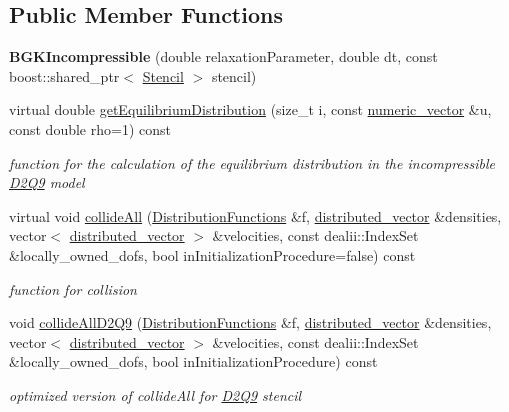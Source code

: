 \subsection*{Public Member Functions}
\begin{DoxyCompactItemize}
\item 
\hypertarget{classnatrium_1_1BGKIncompressible_a356e597953a0a7f69ca797a4c15f4039}{
{\bfseries BGKIncompressible} (double relaxationParameter, double dt, const boost::shared\_\-ptr$<$ \hyperlink{classnatrium_1_1Stencil}{Stencil} $>$ stencil)}
\label{classnatrium_1_1BGKIncompressible_a356e597953a0a7f69ca797a4c15f4039}

\item 
virtual double \hyperlink{classnatrium_1_1BGKIncompressible_a26dd8954261b04f8383ca9d37f5ac8c0}{getEquilibriumDistribution} (size\_\-t i, const \hyperlink{namespacenatrium_a67c39077adc6634f8fa3762b8eef24c4}{numeric\_\-vector} \&u, const double rho=1) const 
\begin{DoxyCompactList}\small\item\em function for the calculation of the equilibrium distribution in the incompressible \hyperlink{classnatrium_1_1D2Q9}{D2Q9} model \item\end{DoxyCompactList}\item 
virtual void \hyperlink{classnatrium_1_1BGKIncompressible_a53dc53b5ddb31a6ef67acd25abb405f1}{collideAll} (\hyperlink{classnatrium_1_1DistributionFunctions}{DistributionFunctions} \&f, \hyperlink{namespacenatrium_a903d2b92917f582f2ff05f52160ab811}{distributed\_\-vector} \&densities, vector$<$ \hyperlink{namespacenatrium_a903d2b92917f582f2ff05f52160ab811}{distributed\_\-vector} $>$ \&velocities, const dealii::IndexSet \&locally\_\-owned\_\-dofs, bool inInitializationProcedure=false) const 
\begin{DoxyCompactList}\small\item\em function for collision \item\end{DoxyCompactList}\item 
\hypertarget{classnatrium_1_1BGKIncompressible_aa7f79409678bd0992ca7da81c4632707}{
void \hyperlink{classnatrium_1_1BGKIncompressible_aa7f79409678bd0992ca7da81c4632707}{collideAllD2Q9} (\hyperlink{classnatrium_1_1DistributionFunctions}{DistributionFunctions} \&f, \hyperlink{namespacenatrium_a903d2b92917f582f2ff05f52160ab811}{distributed\_\-vector} \&densities, vector$<$ \hyperlink{namespacenatrium_a903d2b92917f582f2ff05f52160ab811}{distributed\_\-vector} $>$ \&velocities, const dealii::IndexSet \&locally\_\-owned\_\-dofs, bool inInitializationProcedure) const }
\label{classnatrium_1_1BGKIncompressible_aa7f79409678bd0992ca7da81c4632707}

\begin{DoxyCompactList}\small\item\em optimized version of collideAll for \hyperlink{classnatrium_1_1D2Q9}{D2Q9} stencil \item\end{DoxyCompactList}\end{DoxyCompactItemize}


